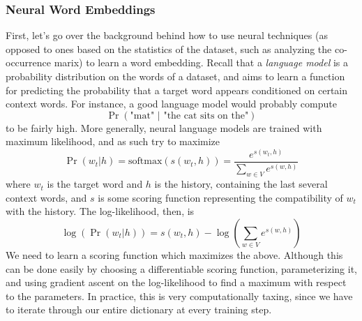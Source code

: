\documentclass{article}
\begin{document}
\subsubsection{Neural Word Embeddings}
First, let's go over the background behind how to use neural techniques (as opposed to ones based on the statistics of the dataset, such as analyzing the co-occurrence marix) to learn a word embedding. Recall that a \textit{language model} is a probability distribution on the words of a dataset, and aims to learn a function for predicting the probability that a target word appears conditioned on certain context words. For instance, a good language model would probably compute
$$ \Pr(\text{"mat" } | \text{ "the cat sits on the"}) $$
to be fairly high. More generally, neural language models are trained with maximum likelihood, and as such try to maximize
$$ \Pr(w_t | h) = \text{softmax}(s(w_t, h)) = \frac{e^{s(w_t, h)}}{\sum_{w \in V} e^{s(w, h)}} $$
where $ w_t $ is the target word and $ h $ is the history, containing the last several context words, and $ s $ is some scoring function representing the compatibility of $ w_t $ with the history. The log-likelihood, then, is
$$ \log \left( \Pr(w_t | h) \right) = s(w_t, h) - \log \left( \sum_{w \in V} e^{s(w, h)} \right) $$
We need to learn a scoring function which maximizes the above. Although this can be done easily by choosing a differentiable scoring function, parameterizing it, and using gradient ascent on the log-likelihood to find a maximum with respect to the parameters. In practice, this is very computationally taxing, since we have to iterate through our entire dictionary at every training step.
\end{document}
